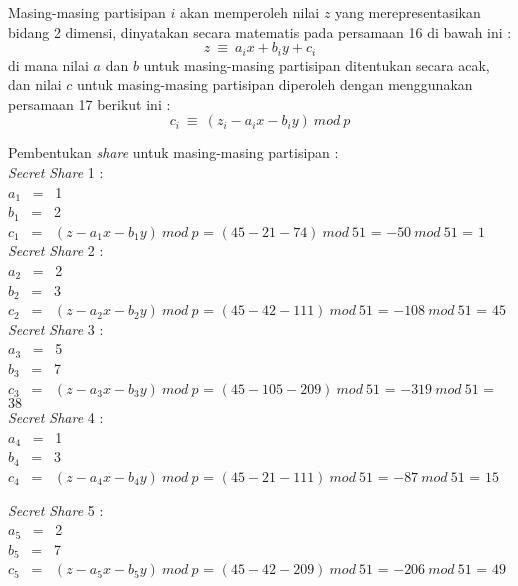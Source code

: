 \documentclass[a4paper,twoside]{article}
\begin{document}
\begin{enumerate}
\begin{itemize}
Masing-masing partisipan $i$ akan memperoleh nilai $z$ yang merepresentasikan bidang 2 dimensi, dinyatakan secara matematis pada persamaan 16 di bawah ini : 
\begin{equation}
z \ \equiv \ a_{i}x + b_{i}y + c_{i}
\end{equation}
di mana nilai $a$ dan $b$ untuk masing-masing partisipan ditentukan secara acak, dan nilai $c$ untuk masing-masing partisipan diperoleh dengan menggunakan persamaan 17 berikut ini : 
\begin{equation}
c_{i} \ \equiv \ (z_{i}-a_{i}x-b_{i}y) \ mod \ p
\end{equation}

Pembentukan \textit{share} untuk masing-masing partisipan :\\
\textit{Secret Share} 1 : \\
$a_{1}$ \ = \ 1 \\
$b_{1}$ \ = \ 2 \\
$c_{1}$ \ = \ $(z - a_{1}x - b_{1}y) \ mod \ p$ = $(45-21-74) \ mod \ 51$ = $-50 \ mod \ 51$ = $1$ \\

\textit{Secret Share} 2 : \\
$a_{2}$ \ = \ 2 \\
$b_{2}$ \ = \ 3 \\
$c_{2}$ \ = \ $(z - a_{2}x - b_{2}y) \ mod \ p$ = $(45-42-111) \ mod \ 51$ = $-108 \ mod \ 51$ = $45$ \\

\textit{Secret Share} 3 : \\
$a_{3}$ \ = \ 5 \\
$b_{3}$ \ = \ 7 \\
$c_{3}$ \ = \ $(z - a_{3}x - b_{3}y) \ mod \ p$ = $(45-105-209) \ mod \ 51$ = $-319 \ mod \ 51$ = $38$ \\

\textit{Secret Share} 4 : \\
$a_{4}$ \ = \ 1 \\
$b_{4}$ \ = \ 3 \\
$c_{4}$ \ = \ $(z - a_{4}x - b_{4}y) \ mod \ p$ = $(45-21-111) \ mod \ 51$ = $-87 \ mod \ 51$ = $15$ \\

\clearpage

\textit{Secret Share} 5 : \\
$a_{5}$ \ = \ 2 \\
$b_{5}$ \ = \ 7 \\
$c_{5}$ \ = \ $(z - a_{5}x - b_{5}y) \ mod \ p$ = $(45-42-209) \ mod \ 51$ = $-206 \ mod \ 51$ = $49$ \\


\end{itemize}
\end{enumerate}
\end{document}
